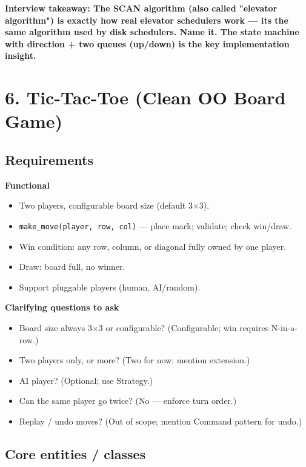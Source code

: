 \documentclass[11pt]{article}
\providecommand{\tightlist}{\setlength{\itemsep}{1pt}\setlength{\parskip}{0pt}}
\begin{document}
\textbf{Interview takeaway: The SCAN algorithm (also called "elevator algorithm") is exactly how real elevator schedulers work --- it\textquotesingle s the same algorithm used by disk schedulers. Name it. The state machine with direction + two queues (up/down) is the key implementation insight.}

\section{6. Tic-Tac-Toe (Clean OO Board Game)}\label{6-tic-tac-toe-clean-oo-board-game}

\subsection{Requirements}\label{requirements-5}

\textbf{Functional}

\begin{itemize}
\tightlist
\item
  Two players, configurable board size (default 3\(\times\)3).
\item
  \texttt{make\_move(player,\ row,\ col)} --- place mark; validate; check win/draw.
\item
  Win condition: any row, column, or diagonal fully owned by one player.
\item
  Draw: board full, no winner.
\item
  Support pluggable players (human, AI/random).
\end{itemize}

\textbf{Clarifying questions to ask}

\begin{itemize}
\tightlist
\item
  Board size always 3\(\times\)3 or configurable? (Configurable; win requires N-in-a-row.)
\item
  Two players only, or more? (Two for now; mention extension.)
\item
  AI player? (Optional; use Strategy.)
\item
  Can the same player go twice? (No --- enforce turn order.)
\item
  Replay / undo moves? (Out of scope; mention Command pattern for undo.)
\end{itemize}

\subsection{Core entities / classes}\label{core-entities--classes-5}
\end{document}
